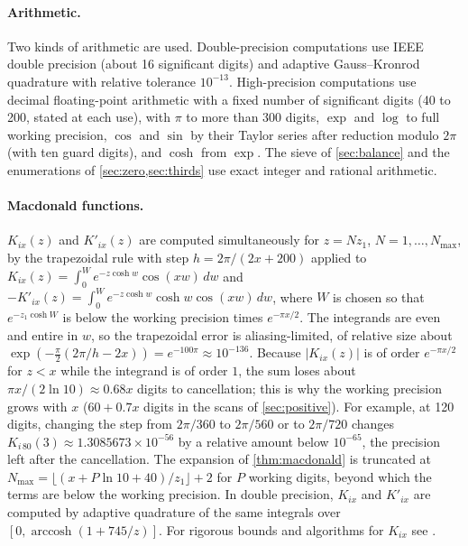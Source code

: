 \documentclass[11pt]{article}
\theoremstyle{definition}\newtheorem{definition}[theorem]{Definition}
\theoremstyle{remark}\newtheorem{remark}[theorem]{Remark}
\begin{document}
\paragraph{Arithmetic.} Two kinds of arithmetic are used. Double-precision computations use IEEE double precision (about 16 significant digits) and adaptive Gauss--Kronrod quadrature with relative tolerance $10^{-13}$. High-precision computations use decimal floating-point arithmetic with a fixed number of significant digits (40 to 200, stated at each use), with $\pi$ to more than 300 digits, $\exp$ and $\log$ to full working precision, $\cos$ and $\sin$ by their Taylor series after reduction modulo $2\pi$ (with ten guard digits), and $\cosh$ from $\exp$. The sieve of \cref{sec:balance} and the enumerations of \cref{sec:zero,sec:thirds} use exact integer and rational arithmetic.

\paragraph{Macdonald functions.} $K_{ix}(z)$ and $K'_{ix}(z)$ are computed simultaneously for $z=Nz_1$, $N=1,\dots,N_{\max}$, by the trapezoidal rule with step $h=2\pi/(2x+200)$ applied to $K_{ix}(z)=\int_0^We^{-z\cosh w}\cos(xw)\,dw$ and $-K'_{ix}(z)=\int_0^We^{-z\cosh w}\cosh w\cos(xw)\,dw$, where $W$ is chosen so that $e^{-z_1\cosh W}$ is below the working precision times $e^{-\pi x/2}$. The integrands are even and entire in $w$, so the trapezoidal error is aliasing-limited, of relative size about $\exp(-\frac\pi2(2\pi/h-2x))=e^{-100\pi}\approx10^{-136}$. Because $|K_{ix}(z)|$ is of order $e^{-\pi x/2}$ for $z<x$ while the integrand is of order $1$, the sum loses about $\pi x/(2\ln10)\approx0.68x$ digits to cancellation; this is why the working precision grows with $x$ ($60+0.7x$ digits in the scans of \cref{sec:positive}). For example, at 120 digits, changing the step from $2\pi/360$ to $2\pi/560$ or to $2\pi/720$ changes $K_{i\,80}(3)\approx1.3085673\times10^{-56}$ by a relative amount below $10^{-65}$, the precision left after the cancellation. The expansion of \cref{thm:macdonald} is truncated at $N_{\max}=\lfloor(x+P\ln10+40)/z_1\rfloor+2$ for $P$ working digits, beyond which the terms are below the working precision. In double precision, $K_{ix}$ and $K'_{ix}$ are computed by adaptive quadrature of the same integrals over $[0,\operatorname{arccosh}(1+745/z)]$. For rigorous bounds and algorithms for $K_{ix}$ see \cite{BST}.
\end{document}

